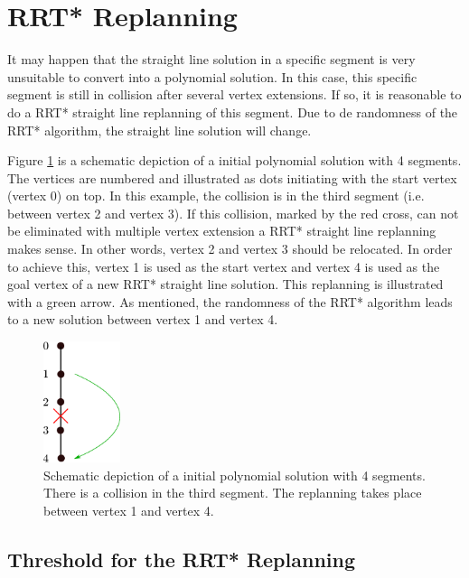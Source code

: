 \section{RRT* Replanning}\label{sec:replanningPassages}

It may happen that the straight line solution in a specific segment is very unsuitable to convert into a polynomial solution. In this case, this specific segment is still in collision after several vertex extensions. If so, it is reasonable to do a RRT* straight line replanning of this segment. Due to de randomness of the RRT* algorithm, the straight line solution will change. \newline

Figure \ref{pic:vertexExtensionRRT} is a schematic depiction of a initial polynomial solution with 4 segments. The vertices are numbered and illustrated as dots initiating with the start vertex (vertex 0) on top. In this example, the collision is in the third segment (i.e. between vertex 2 and vertex 3). If this collision, marked by the red cross, can not be eliminated with multiple vertex extension a RRT* straight line replanning makes sense. In other words, vertex 2 and vertex 3 should be relocated. 
In order to achieve this, vertex 1 is used as the start vertex and vertex 4 is used as the goal vertex of a new RRT* straight line solution. This replanning is illustrated with a green arrow. As mentioned, the randomness of the RRT* algorithm leads to a new solution between vertex 1 and vertex 4.


\begin{figure}[h]
   \centering
   \includegraphics[width=0.2\textwidth]{pics/vertexExtensionRRT.eps}
   \caption{Schematic depiction of a initial polynomial solution with 4 segments. There is a collision in the third segment. The replanning takes place between vertex 1 and vertex 4.}
   \label{pic:vertexExtensionRRT}
\end{figure}


\subsection{Threshold for the RRT* Replanning}\label{sec:RRTreplanning}

